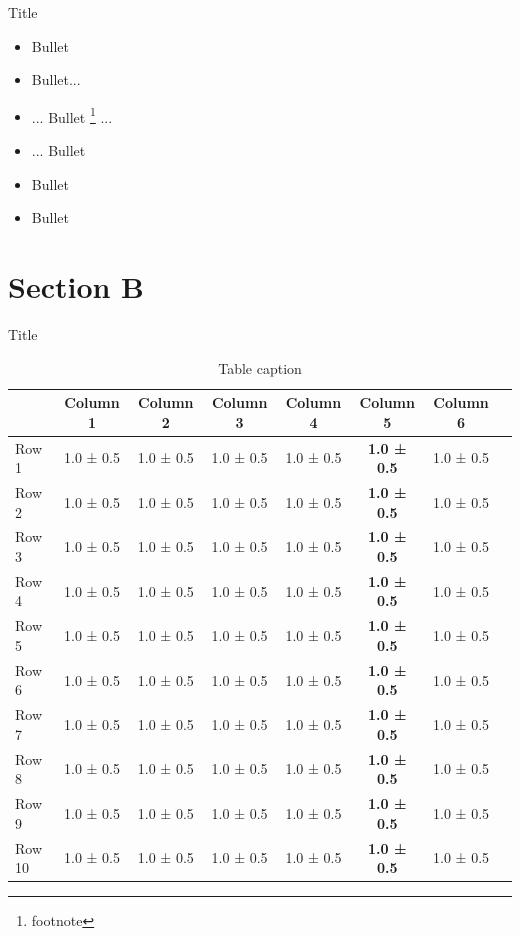\documentclass[8pt, aspectratio=169]{beamer} %
\begin{document}
\begin{frame}{Title}

    \begin{itemize}
        \item Bullet
        \vspace{15pt}
        \item Bullet...
        \item[ ] ... Bullet \footnote{footnote}  ...
        \item[ ] \hspace{10pt} ... Bullet
        \vspace{15pt}
        \item Bullet
        \item Bullet
    \end{itemize}
\end{frame}


\section{Section B}

\begin{frame}{Title}
    \vspace{10pt}
    \begin{table}
    \centering
    \begin{tabular}{lccccccc} 
        \toprule
        & Column 1 & Column 2 & Column 3 & Column 4 & Column 5 & Column 6 \\ 
        \midrule
        Row 1 & 1.0 ± 0.5  & 1.0 ± 0.5 & 1.0 ± 0.5 & 1.0 ± 0.5 & \textbf{1.0 ± 0.5} & 1.0 ± 0.5 \\
        Row 2 & 1.0 ± 0.5  & 1.0 ± 0.5 & 1.0 ± 0.5 & 1.0 ± 0.5 & \textbf{1.0 ± 0.5} & 1.0 ± 0.5 \\
        Row 3 & 1.0 ± 0.5  & 1.0 ± 0.5 & 1.0 ± 0.5 & 1.0 ± 0.5 & \textbf{1.0 ± 0.5} & 1.0 ± 0.5 \\
        Row 4 & 1.0 ± 0.5  & 1.0 ± 0.5 & 1.0 ± 0.5 & 1.0 ± 0.5 & \textbf{1.0 ± 0.5} & 1.0 ± 0.5 \\
        Row 5 & 1.0 ± 0.5  & 1.0 ± 0.5 & 1.0 ± 0.5 & 1.0 ± 0.5 & \textbf{1.0 ± 0.5} & 1.0 ± 0.5 \\
        \midrule
        Row 6 & 1.0 ± 0.5  & 1.0 ± 0.5 & 1.0 ± 0.5 & 1.0 ± 0.5 & \textbf{1.0 ± 0.5} & 1.0 ± 0.5 \\
        Row 7 & 1.0 ± 0.5  & 1.0 ± 0.5 & 1.0 ± 0.5 & 1.0 ± 0.5 & \textbf{1.0 ± 0.5} & 1.0 ± 0.5 \\
        Row 8 & 1.0 ± 0.5  & 1.0 ± 0.5 & 1.0 ± 0.5 & 1.0 ± 0.5 & \textbf{1.0 ± 0.5} & 1.0 ± 0.5 \\
        Row 9 & 1.0 ± 0.5  & 1.0 ± 0.5 & 1.0 ± 0.5 & 1.0 ± 0.5 & \textbf{1.0 ± 0.5} & 1.0 ± 0.5 \\
        Row 10 & 1.0 ± 0.5  & 1.0 ± 0.5 & 1.0 ± 0.5 & 1.0 ± 0.5 & \textbf{1.0 ± 0.5} & 1.0 ± 0.5 \\
        \bottomrule
    \end{tabular}
    \caption{Table caption}
\end{table}
\end{frame}
\end{document}
